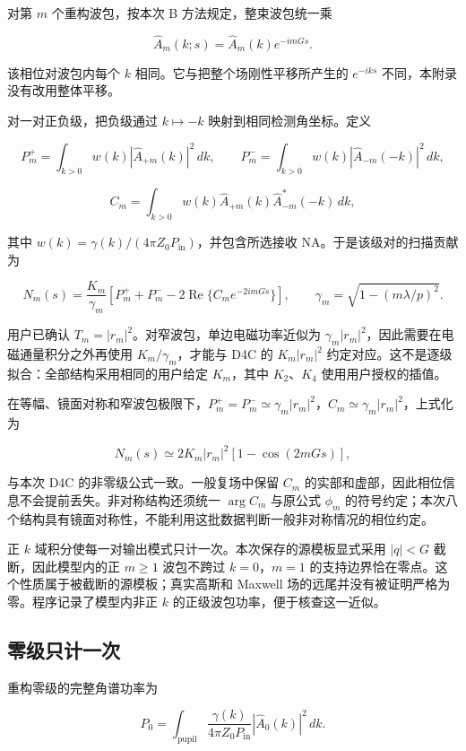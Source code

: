 \documentclass[
  chinese,
  UTF8,
  a4paper,
  11pt]{ctexart}
\begin{document}
对第 \(m\) 个重构波包，按本次 B 方法规定，整束波包统一乘

\[
\widehat A_m(k;s)=\widehat A_m(k)e^{-imGs}.
\]

该相位对波包内每个 \(k\) 相同。它与把整个场刚性平移所产生的 \(e^{-iks}\)
不同，本附录没有改用整体平移。

对一对正负级，把负级通过 \(k\mapsto-k\) 映射到相同检测角坐标。定义

\[
P_m^+=\int_{k>0}w(k)|\widehat A_{+m}(k)|^2\,dk,
\qquad
P_m^-=\int_{k>0}w(k)|\widehat A_{-m}(-k)|^2\,dk,
\]

\[
C_m=\int_{k>0}w(k)
\widehat A_{+m}(k)\widehat A_{-m}^*(-k)\,dk,
\]

其中 \(w(k)=\gamma(k)/(4\pi Z_0P_{\mathrm{in}})\)，并包含所选接收
NA。于是该级对的扫描贡献为

\[
N_m(s)
=\frac{K_m}{\gamma_m}
\left[P_m^++P_m^-
-2\operatorname{Re}\{C_me^{-2imGs}\}\right],
\qquad
\gamma_m=\sqrt{1-(m\lambda/p)^2}.
\]

用户已确认 \(T_m=|r_m|^2\)。对窄波包，单边电磁功率近似为
\(\gamma_m|r_m|^2\)，因此需要在电磁通量积分之外再使用
\(K_m/\gamma_m\)，才能与 D4C 的 \(K_m|r_m|^2\)
约定对应。这不是逐级拟合：全部结构采用相同的用户给定 \(K_m\)，其中
\(K_2\)、\(K_4\) 使用用户授权的插值。

在等幅、镜面对称和窄波包极限下，\(P_m^+=P_m^-\simeq\gamma_m|r_m|^2\)，\(C_m\simeq\gamma_m|r_m|^2\)，上式化为

\[
N_m(s)\simeq2K_m|r_m|^2[1-\cos(2mGs)],
\]

与本次 D4C 的非零级公式一致。一般复场中保留 \(C_m\)
的实部和虚部，因此相位信息不会提前丢失。非对称结构还须统一 \(\arg C_m\)
与原公式 \(\phi_m\)
的符号约定；本次八个结构具有镜面对称性，不能利用这批数据判断一般非对称情况的相位约定。

正 \(k\) 域积分使每一对输出模式只计一次。本次保存的源模板显式采用
\(|q|<G\) 截断，因此模型内的正 \(m\ge1\) 波包不跨过 \(k=0\)，\(m=1\)
的支持边界恰在零点。这个性质属于被截断的源模板；真实高斯和 Maxwell
场的远尾并没有被证明严格为零。程序记录了模型内非正 \(k\)
的正级波包功率，便于核查这一近似。

\subsection{零级只计一次}\label{ux96f6ux7ea7ux53eaux8ba1ux4e00ux6b21}

重构零级的完整角谱功率为

\[
P_0=\int_{\mathrm{pupil}}
\frac{\gamma(k)}{4\pi Z_0P_{\mathrm{in}}}
|\widehat A_0(k)|^2\,dk.
\]
\end{document}
